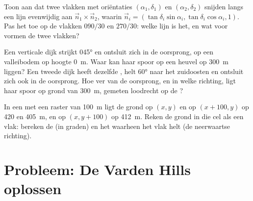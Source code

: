 \begin{exercise}[$\star\star\star$]\label{exo:b1:geological-maps:10}
Toon aan dat twee vlakken met oriëntaties $(\alpha_1, \delta_1)$ en $(\alpha_2, \delta_2)$ snijden langs een lijn
evenwijdig aan $\vec n_1 \times \vec n_2$, waarin $\vec n_i = (\tan\delta_i\sin\alpha_i,
\tan\delta_i\cos\alpha_i, 1)$. Pas het toe op de vlakken $090/30$ en $270/30$: welke lijn is het, en
wat voor  vormen de twee vlakken?
\end{exercise}

\begin{exercise}[$\star\star\star$]\label{exo:b1:geological-maps:11}
Een verticale dijk strijkt \ang{045} en ontsluit zich in de oorsprong, op een valleibodem op hoogte
\qty{0}{m}. Waar kan haar spoor op een heuvel op \qty{300}{m} liggen? Een tweede dijk heeft dezelfde ,
helt \ang{60} naar het zuidoosten en ontsluit zich ook in de oorsprong. Hoe ver van de oorsprong, en in
welke richting, ligt haar spoor op grond van \qty{300}{m}, gemeten loodrecht op de ?
\end{exercise}

\begin{exercise}[$\star\star\star$]\label{exo:b1:geological-maps:12}
In een  met een raster van \qty{100}{m} ligt de grond op $(x, y)$ en op
$(x + 100, y)$ op 420 en \qty{405}{m}, en op $(x, y + 100)$ op \qty{412}{m}. Reken de grond in die cel
als een vlak: bereken de  (in graden) en het  waarheen het vlak helt (de neerwaartse richting).
\end{exercise}

\section{Probleem: De Varden Hills oplossen}

